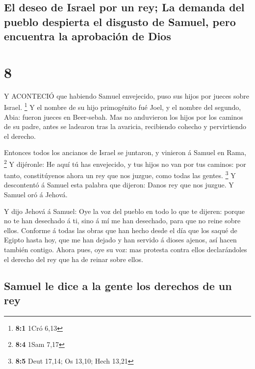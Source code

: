 \hypertarget{el-deseo-de-israel-por-un-rey-la-demanda-del-pueblo-despierta-el-disgusto-de-samuel-pero-encuentra-la-aprobaciuxf3n-de-dios}{%
\subsection{El deseo de Israel por un rey; La demanda del pueblo
despierta el disgusto de Samuel, pero encuentra la aprobación de
Dios}\label{el-deseo-de-israel-por-un-rey-la-demanda-del-pueblo-despierta-el-disgusto-de-samuel-pero-encuentra-la-aprobaciuxf3n-de-dios}}

\hypertarget{section-7}{%
\section{8}\label{section-7}}

 Y ACONTECIÓ que habiendo Samuel envejecido, puso sus hijos
por jueces sobre Israel. \footnote{\textbf{8:1} 1Cró 6,13} 
Y el nombre de su hijo primogénito fué Joel, y el nombre del segundo,
Abia: fueron jueces en Beer-sebah.  Mas no anduvieron los
hijos por los caminos de su padre, antes se ladearon tras la avaricia,
recibiendo cohecho y pervirtiendo el derecho.

 Entonces todos los ancianos de Israel se juntaron, y
vinieron á Samuel en Rama, \footnote{\textbf{8:4} 1Sam 7,17}
 Y dijéronle: He aquí tú has envejecido, y tus hijos no van
por tus caminos: por tanto, constitúyenos ahora un rey que nos juzgue,
como todas las gentes. \footnote{\textbf{8:5} Deut 17,14; Os 13,10; Hech
  13,21}  Y descontentó á Samuel esta palabra que dijeron:
Danos rey que nos juzgue. Y Samuel oró á Jehová.

 Y dijo Jehová á Samuel: Oye la voz del pueblo en todo lo
que te dijeren: porque no te han desechado á ti, sino á mí me han
desechado, para que no reine sobre ellos.  Conforme á todas
las obras que han hecho desde el día que los saqué de Egipto hasta hoy,
que me han dejado y han servido á dioses ajenos, así hacen también
contigo.  Ahora pues, oye su voz: mas protesta contra ellos
declarándoles el derecho del rey que ha de reinar sobre ellos.

\hypertarget{samuel-le-dice-a-la-gente-los-derechos-de-un-rey}{%
\subsection{Samuel le dice a la gente los derechos de un
rey}\label{samuel-le-dice-a-la-gente-los-derechos-de-un-rey}}

